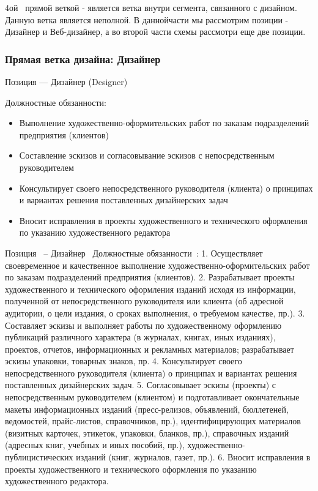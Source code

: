 \documentclass{../industrial-development}
\begin{document}
{\lecturenotes
 4ой~\cite{mc} прямой веткой  - является ветка внутри сегмента, связанного с дизайном. Данную ветка является неполной. В даннойчасти мы рассмотрим позиции - Дизайнер и Веб-дизайнер, а во второй части схемы рассмотри еще две позиции.

\begin{frame} \frametitle{Прямая ветка дизайна: Дизайнер }
 \begin{block}{}
  \alert{Позиция --- Дизайнер (Designer)}

Должностные обязанности: 
  \end{block}
  \begin{itemize}
  \item  Выполнение художественно-оформительских работ по заказам подразделений предприятия (клиентов)
  \item  Составление эскизов и согласовывание эскизов с непосредственным руководителем 
  \item Консультирует своего непосредственного руководителя (клиента) о принципах и вариантах решения поставленных дизайнерских задач
 \item  Вносит исправления в проекты художественного и технического оформления по указанию художественного редактора
  \end{itemize}
\end{frame}

\lecturenotes
Позиция~\cite{hh} – Дизайнер~\cite{itcf}
Должностные обязанности~\cite{rab}:
1.	Осуществляет своевременное и качественное выполнение художественно-оформительских работ по заказам подразделений предприятия (клиентов).
2.	Разрабатывает проекты художественного и технического оформления изданий исходя из информации, полученной от непосредственного руководителя или клиента (об адресной аудитории, о цели издания, о сроках выполнения, о требуемом качестве, пр.).
3.	Составляет эскизы и выполняет работы по художественному оформлению публикаций различного характера (в журналах, книгах, иных изданиях), проектов, отчетов, информационных и рекламных материалов; разрабатывает эскизы упаковки, товарных знаков, пр.
4.	Консультирует своего непосредственного руководителя (клиента) о принципах и вариантах решения поставленных дизайнерских задач.
5.	Согласовывает эскизы (проекты) с непосредственным руководителем (клиентом) и подготавливает окончательные макеты информационных изданий (пресс-релизов, объявлений, бюллетеней, ведомостей, прайс-листов, справочников, пр.), идентифицирующих материалов (визитных карточек, этикеток, упаковки, бланков, пр.), справочных изданий (адресных книг, учебных и иных пособий, пр.), художественно-публицистических изданий (книг, журналов, газет, пр.).
6.	Вносит исправления в проекты художественного и технического оформления по указанию художественного редактора.

}
\end{document}
